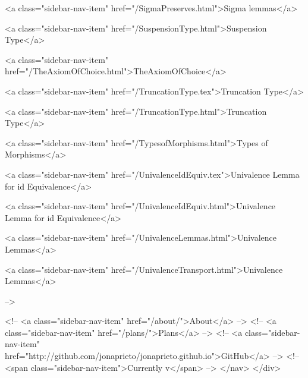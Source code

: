       
    
      
        
          <a class="sidebar-nav-item" href="/SigmaPreserves.html">Sigma lemmas</a>
        
      
    
      
        
          <a class="sidebar-nav-item" href="/SuspensionType.html">Suspension Type</a>
        
      
    
      
        
          <a class="sidebar-nav-item" href="/TheAxiomOfChoice.html">TheAxiomOfChoice</a>
        
      
    
      
        
          <a class="sidebar-nav-item" href="/TruncationType.tex">Truncation Type</a>
        
      
    
      
        
          <a class="sidebar-nav-item" href="/TruncationType.html">Truncation Type</a>
        
      
    
      
        
          <a class="sidebar-nav-item" href="/TypesofMorphisms.html">Types of Morphisms</a>
        
      
    
      
        
          <a class="sidebar-nav-item" href="/UnivalenceIdEquiv.tex">Univalence Lemma for id Equivalence</a>
        
      
    
      
        
          <a class="sidebar-nav-item" href="/UnivalenceIdEquiv.html">Univalence Lemma for id Equivalence</a>
        
      
    
      
        
          <a class="sidebar-nav-item" href="/UnivalenceLemmas.html">Univalence Lemmas</a>
        
      
    
      
        
          <a class="sidebar-nav-item" href="/UnivalenceTransport.html">Univalence Lemmas</a>
        
      
     -->

    <!-- <a class="sidebar-nav-item" href="/about/">About</a> -->
    <!-- <a class="sidebar-nav-item" href="/plans/">Plans</a> -->
    <!-- <a class="sidebar-nav-item" href="http://github.com/jonaprieto/jonaprieto.github.io">GitHub</a> -->
    <!-- <span class="sidebar-nav-item">Currently v</span> -->
  </nav>
</div>

